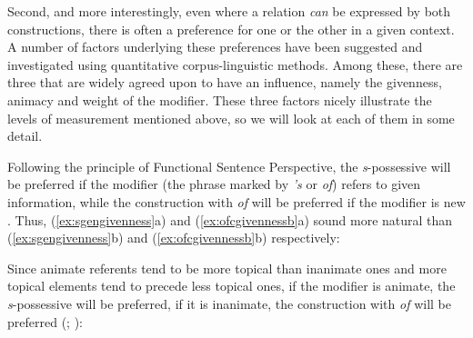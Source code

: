 Second, and more interestingly, even where a relation \textit{can} be expressed by both constructions, there is often a preference for one or the other in a given context. A number of factors underlying these preferences have been suggested and investigated using quantitative  corpus\hyp{}linguistic methods. Among these, there are three that are widely agreed upon to have an influence, namely the givenness,  animacy  and weight  of the modifier. These three factors nicely illustrate the levels of measurement  mentioned above, so we will look at each of them in some detail.\largerpage

\begin{description}[leftmargin=*]
\item[(a) Givenness]  Following the principle of Functional Sentence Perspective, the \textit{s}-possessive  will be preferred if the modifier (the phrase marked by \textit{'s} or \textit{of}) refers to given information, while the construction with \textit{of} will be preferred if the modifier is new \citep{standwell_genitive_1982}. Thus, (\ref{ex:sgengivenness}a) and (\ref{ex:ofcgivennessb}a) sound more natural than (\ref{ex:sgengivenness}b) and (\ref{ex:ofcgivennessb}b) respectively:

\begin{exe}
\ex
\begin{xlist}
\label{ex:sgengivenness}
\end{xlist}
\ex
\begin{xlist}
\label{ex:ofcgivennessb}
\end{xlist}
\end{exe}

\item[(b) Animacy]  Since animate referents tend to be more topical than inanimate ones and more topical elements tend to precede less topical ones, if the modifier is animate,  the \textit{s}-possessive  will be preferred, if it is inanimate, the construction with \textit{of} will be preferred (\citealt[cf.][192--203]{quirk_grammar_1972}; \citealt{deane_english_1987}):


\end{description}
